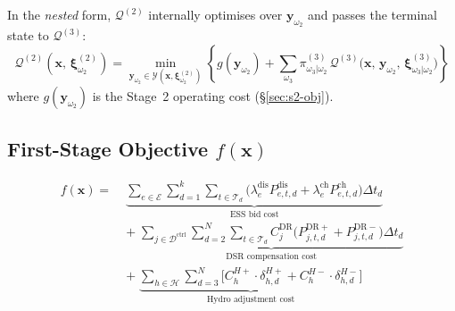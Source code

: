 \documentclass[11pt]{article}
\newcommand{\Pch}{P^{\mathrm{ch}}}
\newcommand{\Pdis}{P^{\mathrm{dis}}}
\begin{document}
In the \emph{nested} form, $\mathcal{Q}^{(2)}$ internally optimises
over $\mathbf{y}_{\omega_2}$ and passes the terminal state to
$\mathcal{Q}^{(3)}$:
\begin{equation}\label{eq:nested}
  \mathcal{Q}^{(2)}(\mathbf{x},\, \boldsymbol{\xi}^{(2)}_{\omega_2})
  = \min_{\mathbf{y}_{\omega_2} \in \mathcal{Y}(\mathbf{x},
    \boldsymbol{\xi}^{(2)}_{\omega_2})}
  \left\{
    g(\mathbf{y}_{\omega_2})
    + \sum_{\omega_3} \pi^{(3)}_{\omega_3|\omega_2}\,
    \mathcal{Q}^{(3)}\!\bigl(\mathbf{x},\,
      \mathbf{y}_{\omega_2},\,
      \boldsymbol{\xi}^{(3)}_{\omega_3|\omega_2}\bigr)
  \right\}
\end{equation}
where $g(\mathbf{y}_{\omega_2})$ is the Stage~2 operating cost
(§\ref{sec:s2-obj}).

\subsection{First-Stage Objective $f(\mathbf{x})$}\label{sec:s1-obj}

\begin{equation}\label{eq:f-obj}
\boxed{
\begin{aligned}
  f(\mathbf{x}) =\;
  & \underbrace{
    \sum_{e \in \mathcal{E}}
    \sum_{d=1}^{k} \sum_{t \in \mathcal{T}_d}
    \bigl(\lambda^{\mathrm{dis}}_e \Pdis_{e,t,d}
    + \lambda^{\mathrm{ch}}_e \Pch_{e,t,d}\bigr)\Delta t_d
  }_{\text{ESS bid cost}} \\
  &+\;
  \underbrace{
    \sum_{j \in \mathcal{D}^{\mathrm{ctrl}}}
    \sum_{d=2}^{N} \sum_{t \in \mathcal{T}_d}
    C^{\mathrm{DR}}_j
    \bigl(P^{\mathrm{DR+}}_{j,t,d} + P^{\mathrm{DR-}}_{j,t,d}\bigr)
    \Delta t_d
  }_{\text{DSR compensation cost}} \\
  &+\;
  \underbrace{
    \sum_{h \in \mathcal{H}} \sum_{d=3}^{N}
    \bigl[
      C^{H+}_h \cdot \delta^{H+}_{h,d}
      + C^{H-}_h \cdot \delta^{H-}_{h,d}
    \bigr]
  }_{\text{Hydro adjustment cost}}
\end{aligned}
}
\end{equation}
\end{document}
